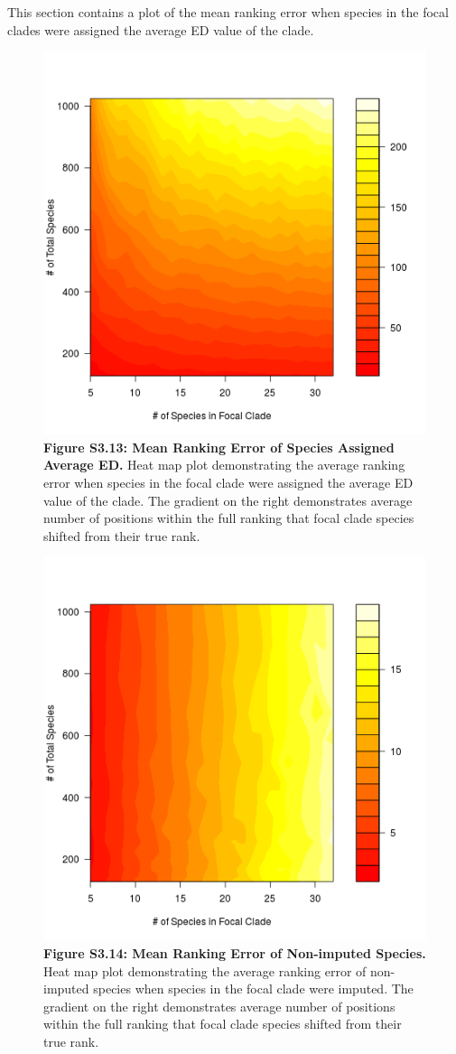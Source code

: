 \documentclass[10pt,english]{article}
\begin{document}
This section contains a plot of the mean ranking error when species in the focal
clades were assigned the average ED value of the clade.

\begin{figure}[!ht]
  \center
  \includegraphics[width=.5\textwidth]{../figures/rankingError_avgEDforClade.png}
  \caption*{\textbf{Figure S3.13: Mean Ranking Error of Species Assigned Average
  ED.} Heat map plot demonstrating the average ranking error when species in the
  focal clade were assigned the average ED value of the clade. The gradient on
  the right demonstrates average number of positions within the full ranking
  that focal clade species shifted from their true rank.}
\end{figure}

\begin{figure}[!ht]
  \center
  \includegraphics[width=.5\textwidth]{../figures/rankingError_remainingSpp.png}
  \caption*{\textbf{Figure S3.14: Mean Ranking Error of Non-imputed Species.}
  Heat map plot demonstrating the average ranking error of non-imputed species
  when species in the focal clade were imputed. The gradient on the right
  demonstrates average number of positions within the full ranking that focal
  clade species shifted from their true rank.}
\end{figure}
\end{document}

